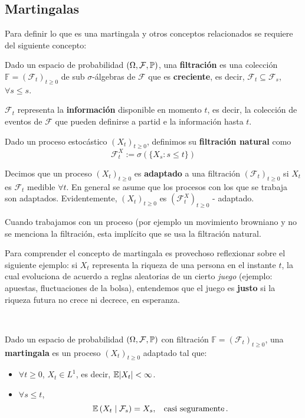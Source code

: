 \subsection{Martingalas}
Para definir lo que es una martingala y otros conceptos relacionados se requiere del siguiente concepto:
\begin{definition}[Filtración]
Dado un espacio de probabilidad $(\Omega, \mathcal{F}, \P)$, una \textbf{filtración} es una colección $\mathbb{F} = (\mathcal{F}_{t})_{t \geq 0}$ de sub $\sigma$-álgebras de $\mathcal{F}$ que es \textbf{creciente}, es decir, $\mathcal{F}_t \subseteq \mathcal{F}_s$, $\forall s \leq s$.
\end{definition}

$\mathcal{F}_t$ representa la \textbf{información} disponible en momento $t$, es decir, la colección de eventos de $\mathcal{F}$ que pueden definirse a partid e la información hasta $t$. 

\newp Dado un proceso estocástico $(X_t)_{t \geq 0}$, definimos su \textbf{filtración natural} como 
\begin{equation*}
        \mathcal{F}^{X}_t := \sigma\left( \{ X_s : s \leq t \}\right) 
\end{equation*}

\newp Decimos que un proceso $(X_{t})_{t \geq 0}$ es \textbf{adaptado} a una filtración $(\mathcal{F}_t)_{t \geq 0}$ 
si $X_t$ es $\mathcal{F}_t$ medible $\forall t$. En general se asume que los procesos con los que se trabaja son adaptados. Evidentemente, $(X_t)_{t \geq 0}$ es $(\mathcal{F}^X_t)_{t \geq 0}$ - adaptado.

\newp Cuando trabajamos con un proceso (por ejemplo un movimiento browniano y no se menciona la filtración, esta implícito que se usa la filtración natural. 

\newp Para comprender el concepto de martingala es provechoso reflexionar sobre el siguiente ejemplo: si $X_t$ representa la riqueza de una persona en el instante $t$, la cual evoluciona de acuerdo a reglas aleatorias de un cierto \textit{juego} (ejemplo: apuestas, fluctuaciones de la bolsa), entendemos que el juego es \textbf{justo} si la riqueza futura no crece ni decrece, en esperanza.

\vspace{1.2cm} \\
\begin{definition}[Martingala]
Dado un espacio de probabilidad $(\Omega, \mathcal{F}, \P)$ con filtración $\mathbb{F} = (\mathcal{F}_{t})_{t \geq 0}$, una \textbf{martingala} es un proceso $(X_t)_{t \geq 0}$ adaptado tal que:
\begin{itemize}
    \item $\forall  t \geq 0$, $X_t \in L^{1}$, es decir, $\E \abs{X_t} < \infty$.
    \item $\forall s \leq t$, 
            \begin{equation*}
                    \E \left( X_t \mid \mathcal{F}_s \right)  = X_s, \espacio \text{casi seguramente}\,.
            \end{equation*}
\end{itemize}
\end{definition}

